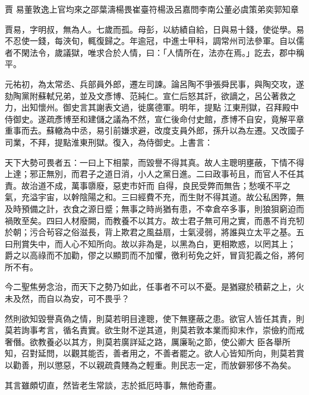 
\begin{pinyinscope}

 賈
 易董敦逸上官均來之邵葉濤楊畏崔臺符楊汲呂嘉問李南公董必虞策弟奕郭知章



 賈易，字明叔，無為人。七歲而孤。母彭，以紡績自給，日與易十錢，使從學。易不忍使一錢，每浹旬，輒復歸之。年逾冠，中進士甲科，調常州司法參軍。自以儒者不閑法令，歲議獄，唯求合於人情，曰：「人情所在，法亦在焉。」訖去，郡中稱平。



 元祐初，為太常丞、兵部員外郎，遷左司諫。論呂陶不爭張舜民事，與陶交攻，遂劾陶黨附蘇軾兄弟，並及文彥博、范純仁。宣仁后怒其訐，欲謫之，呂公著救之力，出知懷州。御史言其謝表文過，徙廣德軍。明年，提點
 江東刑獄，召拜殿中侍御史。遂疏彥博至和建儲之議為不然，宣仁後命付史館，彥博不自安，竟解平章重事而去。蘇轍為中丞，易引前嫌求避，改度支員外郎，孫升以為左遷。又改國子司業，不拜，提點淮東刑獄。復入，為侍御史。上書言：



 天下大勢可畏者五：一曰上下相蒙，而毀譽不得其真。故人主聰明壅蔽，下情不得上達；邪正無別，而君子之道日消，小人之黨日進。二曰政事茍且，而官人不任其責。故治道不成，萬事隳廢，惡吏市奸而
 自得，良民受弊而無告；愁嘆不平之氣，充溢宇宙，以幹陰陽之和。三曰經費不充，而生財不得其道。故公私困弊，無及時預備之計，衣食之源日蹙；無事之時尚猶有患，不幸倉卒多事，則狼狽窮迫而禍敗至矣。四曰人材廢闕，而教養不以其方。故士君子無可用之實，而愚不肖充牣於朝；污合茍容之俗滋長，背上欺君之風益扇，士氣浸弱，將誰與立太平之基。五曰刑賞失中，而人心不知所向。故以非為是，以黑為白，更相欺惑，以罔其上；
 爵之以高祿而不加勸，僇之以顯罰而不加懼，徼利茍免之奸，冒貨犯義之俗，將何所不有。



 今二聖焦勞念治，而天下之勢乃如此，任事者不可以不憂。是猶寢於積薪之上，火未及然，而自以為安，可不畏乎？



 然則欲知毀譽真偽之情，則莫若明目達聰，使下無壅蔽之患。欲官人皆任其責，則莫若詢事考言，循名責實。欲生財不逆其道，則莫若敦本業而抑末作，崇儉約而戒奢僭。欲教養必以其方，則莫若廣詳延之路，厲廉恥之節，使公卿大
 臣各舉所知，召對延問，以觀其能否，善者用之，不善者罷之。欲人心皆知所向，則莫若賞以勸善，刑以懲惡，不以親疏貴賤為之輕重。則民志一定，而放僻邪侈不為矣。



 其言雖頗切直，然皆老生常談，志於抵厄時事，無他奇畫。




\end{pinyinscope}
